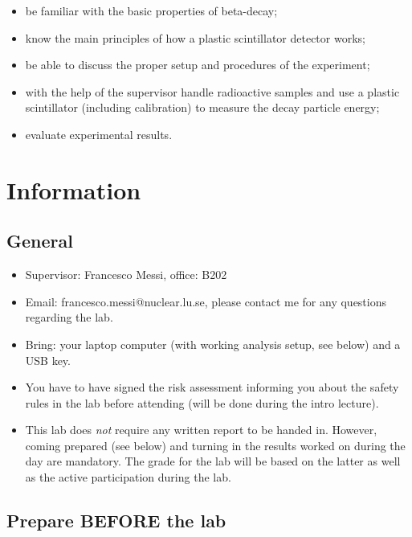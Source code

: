 \documentclass[a4,11pt, notitlepage]{article}
\begin{document}
\begin{itemize}
\item be familiar with the basic properties of beta-decay;
\item know the main principles of how a plastic scintillator detector works;
\item be able to discuss the proper setup and procedures of the experiment;
\item with the help of the supervisor handle radioactive samples and use a
  plastic scintillator (including calibration) to measure the decay particle energy;
\item evaluate experimental results.
\end{itemize}

\section{Information}


\subsection{General}

\begin{itemize}
\item Supervisor: Francesco Messi, office: B202
\item Email: francesco.messi@nuclear.lu.se, please contact me for any questions regarding the lab. 
\item Bring: your laptop computer (with working
  analysis setup, see below) and a USB key. 
\item You have to have signed the risk assessment informing you about the safety
  rules in the lab before attending (will be done during the intro lecture).
\item This lab does \emph{not} require any written report to be handed in.
  However, coming prepared (see below) and turning in the results worked on
  during the day are mandatory. The grade for the lab will be based on the
  latter as well as the active participation during the lab.
\end{itemize}



\subsection{Prepare BEFORE the lab}
\end{document}

